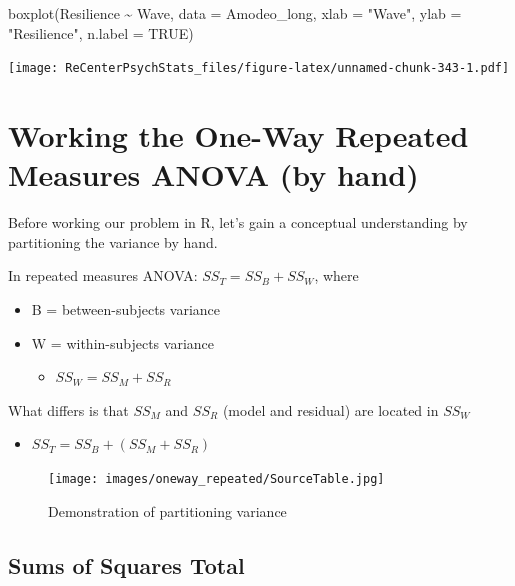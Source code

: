 \documentclass[
  11pt,
]{book}
\newenvironment{Shaded}{\begin{snugshade}}{\end{snugshade}}
\newcommand{\AttributeTok}[1]{\textcolor[rgb]{0.77,0.63,0.00}{#1}}
\newcommand{\ConstantTok}[1]{\textcolor[rgb]{0.00,0.00,0.00}{#1}}
\newcommand{\FunctionTok}[1]{\textcolor[rgb]{0.00,0.00,0.00}{#1}}
\newcommand{\NormalTok}[1]{#1}
\newcommand{\SpecialCharTok}[1]{\textcolor[rgb]{0.00,0.00,0.00}{#1}}
\newcommand{\StringTok}[1]{\textcolor[rgb]{0.31,0.60,0.02}{#1}}
\providecommand{\tightlist}{%
  \setlength{\itemsep}{0pt}\setlength{\parskip}{0pt}}
\begin{document}
\begin{Shaded}
\begin{Highlighting}[]
\FunctionTok{boxplot}\NormalTok{(Resilience }\SpecialCharTok{\textasciitilde{}}\NormalTok{ Wave, }\AttributeTok{data =}\NormalTok{ Amodeo\_long, }\AttributeTok{xlab =} \StringTok{"Wave"}\NormalTok{, }\AttributeTok{ylab =} \StringTok{"Resilience"}\NormalTok{,}
    \AttributeTok{n.label =} \ConstantTok{TRUE}\NormalTok{)}
\end{Highlighting}
\end{Shaded}

\texttt{[image: ReCenterPsychStats\_files/figure-latex/unnamed-chunk-343-1.pdf]}

\hypertarget{working-the-one-way-repeated-measures-anova-by-hand}{%
\section{Working the One-Way Repeated Measures ANOVA (by hand)}\label{working-the-one-way-repeated-measures-anova-by-hand}}

Before working our problem in R, let's gain a conceptual understanding by partitioning the variance by hand.

In repeated measures ANOVA: \(SS_T = SS_B + SS_W\), where

\begin{itemize}
\tightlist
\item
  B = between-subjects variance
\item
  W = within-subjects variance

  \begin{itemize}
  \tightlist
  \item
    \(SS_W = SS_M + SS_R\)
  \end{itemize}
\end{itemize}

What differs is that \(SS_M\) and \(SS_R\) (model and residual) are located in \(SS_W\)

\begin{itemize}
\tightlist
\item
  \(SS_T = SS_B + (SS_M + SS_R)\)
\end{itemize}

\begin{figure}
\centering
\texttt{[image: images/oneway\_repeated/SourceTable.jpg]}
\caption{Demonstration of partitioning variance}
\end{figure}

\hypertarget{sums-of-squares-total-2}{%
\subsection{Sums of Squares Total}\label{sums-of-squares-total-2}}
\end{document}
